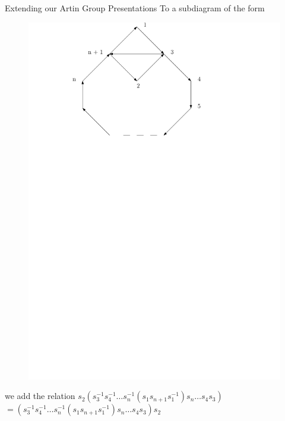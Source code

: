 \documentclass{beamer}
\begin{document}
\begin{frame}{Extending our Artin Group Presentations}
To a subdiagram of the form
\begin{figure}
\includegraphics[scale = .50]{Diagram2.pdf}
\end{figure}
we add the relation
$s_{2}(s_{3}^{-1}s_{4}^{-1}\dots s_{n}^{-1}(s_{1}s_{n+1}s_{1}^{-1})s_{n} \dots s_{4}s_{3})$
\newline $= (s_{3}^{-1}s_{4}^{-1}\dots s_{n}^{-1}(s_{1}s_{n+1}s_{1}^{-1})s_{n} \dots s_{4}s_{3})s_{2}$
\end{frame}
\end{document}
